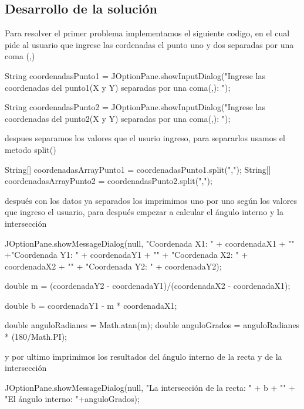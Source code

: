 \subsection{Desarrollo de la solución}
Para resolver el primer problema implementamos el siguiente codigo, en el cual pide al usuario que ingrese las cordenadas el punto uno y dos separadas por una coma (,) 

\begin{javaCode}
    String coordenadasPunto1 = JOptionPane.showInputDialog("Ingrese las coordenadas del punto1(X y Y) separadas por una coma(,): ");
        
        String coordenadasPunto2 = JOptionPane.showInputDialog("Ingrese las coordenadas del punto2(X y Y) separadas por una coma(,): ");
\end{javaCode}

despues separamos los valores que el usurio ingreso, para separarlos usamos el metodo split()

\begin{javaCode}
        
        String[] coordenadasArrayPunto1 = coordenadasPunto1.split(",");
        String[] coordenadasArrayPunto2 = coordenadasPunto2.split(",");
\end{javaCode}

después con los datos ya separados los imprimimos uno por uno según los valores que ingreso el usuario, para después empezar a calcular el ángulo interno y la intersección 

\begin{javaCode}
 
        JOptionPane.showMessageDialog(null, "Coordenada X1: " + coordenadaX1 + "\n" +"Coordenada Y1: " + coordenadaY1 + "\n" + "Coordenada X2: " + coordenadaX2 + "\n" + "Coordenada Y2: " + coordenadaY2);

    double m = (coordenadaY2 - coordenadaY1)/(coordenadaX2 - coordenadaX1);
        

        double b = coordenadaY1 - m * coordenadaX1;
        
        double anguloRadianes = Math.atan(m);
        double anguloGrados = anguloRadianes * (180/Math.PI);
\end{javaCode}

y por ultimo imprimimos los resultados del ángulo interno de la recta y de la intersección 

\begin{javaCode}
     JOptionPane.showMessageDialog(null, "La intersección de la recta: " + b + "\n" + "El ángulo interno: "+anguloGrados);
\end{javaCode}

